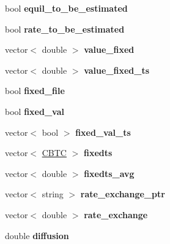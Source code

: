 \begin{DoxyCompactItemize}
bool {\bfseries equil\+\_\+to\+\_\+be\+\_\+estimated}
\item 
\mbox{\label{class_c_constituent_a6959b57125a2d24ee4966177da2de568}} 
bool {\bfseries rate\+\_\+to\+\_\+be\+\_\+estimated}
\item 
\mbox{\label{class_c_constituent_ad3ff7047563a4ac701086e3292d709d7}} 
vector$<$ double $>$ {\bfseries value\+\_\+fixed}
\item 
\mbox{\label{class_c_constituent_ab87894ef7449dde62066c32f39c56a05}} 
vector$<$ double $>$ {\bfseries value\+\_\+fixed\+\_\+ts}
\item 
\mbox{\label{class_c_constituent_a3eabdc84773c4dec014d2dea7196c165}} 
bool {\bfseries fixed\+\_\+file}
\item 
\mbox{\label{class_c_constituent_a7b7be9a07ddf8a35413de64372368322}} 
bool {\bfseries fixed\+\_\+val}
\item 
\mbox{\label{class_c_constituent_a89aebefd0c354e662eb23e80f319c6b6}} 
vector$<$ bool $>$ {\bfseries fixed\+\_\+val\+\_\+ts}
\item 
\mbox{\label{class_c_constituent_a9fdd701402797b01cc83210328b54dc5}} 
vector$<$ \hyperlink{class_c_b_t_c}{C\+B\+TC} $>$ {\bfseries fixedts}
\item 
\mbox{\label{class_c_constituent_a6bf8bab1e0416f07e508c15c41a9c94d}} 
vector$<$ double $>$ {\bfseries fixedts\+\_\+avg}
\item 
\mbox{\label{class_c_constituent_a6ff66ca9d18237a32529f0c501d824b6}} 
vector$<$ string $>$ {\bfseries rate\+\_\+exchange\+\_\+ptr}
\item 
\mbox{\label{class_c_constituent_a9eb43a721bbbcbfaff5db609a41e1f08}} 
vector$<$ double $>$ {\bfseries rate\+\_\+exchange}
\item 
\mbox{\label{class_c_constituent_a0ba02297ca0c492c63063908cc400685}} 
double {\bfseries diffusion}

\end{DoxyCompactItemize}
